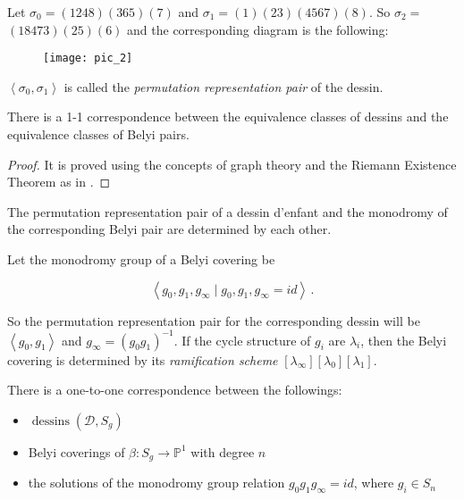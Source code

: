 \begin{example}
    Let $\sigma_{0}=(1248)(365)(7)$ and $\sigma_{1}=(1)(23)(4567)(8)$. So $\sigma_{2}=$ $(18473)(25)(6)$ and the corresponding diagram is the following:
\begin{figure}[htp]
\texttt{[image: pic\_2]}
\end{figure}
\end{example}

\begin{dfn}
    $\left\langle\sigma_{0}, \sigma_{1}\right\rangle$ is called the \textit{permutation representation pair} of the dessin.
\end{dfn}

\begin{thm}
There is a 1-1 correspondence between the equivalence classes of dessins and the equivalence classes of Belyi pairs.
\end{thm}

\begin{proof}
    It is proved using the concepts of graph theory and the Riemann Existence Theorem as in \cite{Kurk}.
\end{proof}

\begin{prop}
    The permutation representation pair of a dessin d'enfant and the monodromy of the corresponding Belyi pair are determined by each other.
\end{prop}

\begin{rem}Let the monodromy group of a Belyi covering be

$$
\left\langle g_{0}, g_{1}, g_{\infty} \mid g_{0}, g_{1}, g_{\infty}=i d\right\rangle\,.
$$

So the permutation representation pair for the corresponding dessin will be $\left\langle g_{0}, g_{1}\right\rangle$ and $g_{\infty}=\left(g_{0} g_{1}\right)^{-1}$. If the cycle structure of $g_{i}$ are $\lambda_{i}$, then the Belyi covering is determined by its \textit{ramification scheme} $\left[\lambda_{\infty}\right]\left[\lambda_{0}\right]\left[\lambda_{1}\right]$.
\end{rem}

\begin{thm}
    There is a one-to-one correspondence between the followings:
\begin{itemize}
    \item $\operatorname{dessins}\left(\mathcal{D}, S_{g}\right)$
    \item Belyi coverings of $\beta: S_{g} \rightarrow \mathbb{P}^{1}$ with degree $n$
    \item the solutions of the monodromy group relation $g_{0} g_{1} g_{\infty}=i d$, where $g_{i} \in S_{n}$
\end{itemize}
\end{thm}


